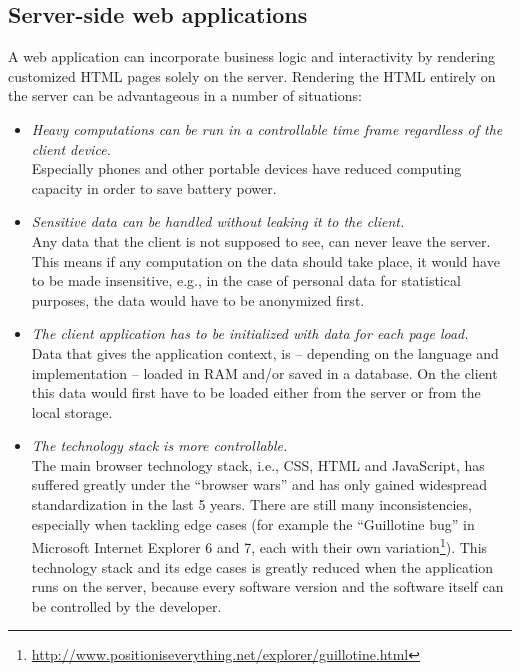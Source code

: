 \documentclass[thesis.tex]{subfiles}
\begin{document}
\subsection{Server-side web applications}
A web application can incorporate business logic and interactivity by rendering
customized HTML pages solely on the server.
Rendering the HTML entirely on the server can be advantageous in a number of
situations:
\begin{itemize}
	\label{list:server-side-arguments}
	\item \emph{Heavy computations can be run in a controllable time frame
	regardless of the client device.}\\
		Especially phones and other portable devices have reduced computing
		capacity in order to save battery power.
	\item \emph{Sensitive data can be handled without leaking it to the
	client.}\\
		Any data that the client is not supposed to see, can never leave the
		server. This means if any computation on the data should take place,
		it would have to be made insensitive, e.g., in the case of personal data
		for statistical purposes, the data would have to be anonymized first.
	\item \emph{The client application has to be initialized with data for each
	page load.}\\
		Data that gives the application context, is -- depending on the language
		and implementation -- loaded in RAM and/or saved in a database. On the
		client this data would first have to be loaded either from the server or
		from the local storage.
	\item \emph{The technology stack is more controllable.}\\
		The main browser technology stack, i.e., CSS, HTML and JavaScript,
		has suffered greatly under the ``browser wars'' 
		and has only gained widespread standardization in the last 5 years.
		There are still many inconsistencies, especially when tackling edge cases
		(for example the ``Guillotine bug'' in Microsoft Internet Explorer 6 and 7,
		each with their own variation\footnote{
		\url{http://www.positioniseverything.net/explorer/guillotine.html}}).
		This technology stack and its edge cases is greatly reduced when
		the application runs on the server, because every software version and
		the software itself can be controlled by the developer.
\end{itemize}
\end{document}
